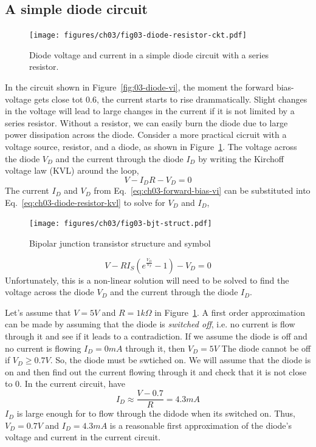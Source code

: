 \subsection{A simple diode circuit}
\begin{figure}[b]
    \centering
    \texttt{[image: figures/ch03/fig03-diode-resistor-ckt.pdf]}
    \caption{Diode voltage and current in a simple diode circuit with a series resistor.}
    \label{fig:03-diode-resistor-ckt}
\end{figure}
In the circuit shown in Figure~\ref{fig:03-diode-vi}, the moment the forward bias-voltage gets close tot 0.6, the current starts to rise drammatically. Slight changes in the voltage will lead to large changes in the current if it is not limited by a series resistor. Without a resistor, we can easily burn the diode due to large power dissipation across the diode. Consider a more practical cicruit with a voltage source, resistor, and a diode, as shown in Figure~\ref{fig:03-diode-resistor-ckt}. The voltage across the diode $V_D$ and the current through the diode $I_D$ by writing the Kirchoff voltage law (KVL) around the loop,
\begin{equation}
    V - I_D R - V_D = 0
    \label{eq:ch03-diode-resistor-kvl}
\end{equation}
The current $I_D$ and $V_D$ from Eq.~\ref{eq:ch03-forward-bias-vi} can be substituted into Eq.~\ref{eq:ch03-diode-resistor-kvl} to solve for $V_D$ and $I_D$,
\begin{figure}[t]
    \centering
    \texttt{[image: figures/ch03/fig03-bjt-struct.pdf]}
    \caption{Bipolar junction transistor structure and symbol}
    \label{fig:03-04}
\end{figure}
\begin{equation}
    V - R I_S \left( e^{\frac{V_D}{V_T}} - 1 \right) - V_D = 0
    \label{eq:ch03-diode-resistor-vd-id}
\end{equation}
Unfortunately, this is a non-linear solution will need to be solved to find the voltage across the diode $V_D$ and the current through the diode $I_D$. 

Let's assume that $V=5V$ and $R=1k\Omega$ in Figure~\ref{fig:03-diode-resistor-ckt}. A first order approximation can be made by assuming that the diode is \textit{switched off}, i.e. no current is flow through it and see if it leads to a contradiction. If we assume the diode is off and no current is flowing $I_D = 0mA$ through it, then $V_D = 5V$ The diode cannot be off if $V_D \geq 0.7V$. So, the diode must be swtiched on. We will assume that the diode is on and then find out the current flowing through it and check that it is not close to 0. In the current circuit, have 
\begin{equation}
    I_D \approx \frac{V - 0.7}{R} = 4.3mA
    \label{eq:ch03-diode-resistor-id-approx}
\end{equation}
$I_D$ is large enough for to flow through the didode when its switched on. Thus, $V_D=0.7V$ and $I_D=4.3mA$ is a reasonable first approximation of the diode's voltage and current in the current circuit.

